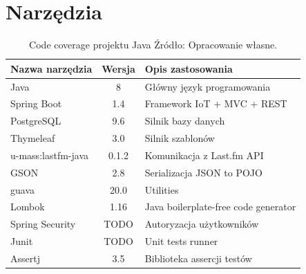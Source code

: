 \documentclass[brudnopis]{xmgr}
\begin{document}
\section{Narzędzia}

\begin{table}
\begin{tabular}{|l|c|l|}
	\hline
	Nazwa narzędzia & Wersja & Opis zastosowania \\
	\hline
	Java & 8 & Główny język programowania \\
	\hline
	Spring Boot & 1.4 & Framework IoT + MVC + REST \\
	\hline
	PostgreSQL & 9.6 & Silnik bazy danych \\
	\hline
	Thymeleaf & 3.0 & Silnik szablonów \\
	\hline
	u-mass:lastfm-java & 0.1.2 & Komunikacja z Last.fm API \\
	\hline
	GSON & 2.8 & Serializacja JSON to POJO \\
	\hline
	guava & 20.0 & Utilities \\
	\hline
	Lombok & 1.16 & Java boilerplate-free code generator \\
	\hline
	Spring Security & TODO & Autoryzacja użytkowników \\
	\hline
	Junit & TODO & Unit tests runner \\
	\hline
	Assertj & 3.5 & Biblioteka assercji testów \\
	\hline
\end{tabular}
    \caption{
	Code coverage projektu Java
	\newline Źródło: Opracowanie własne.
	}
	\label{Projekt - Code coverage}
\end{table}





\listoftables

\listoffigures

\oswiadczenie
\end{document}
